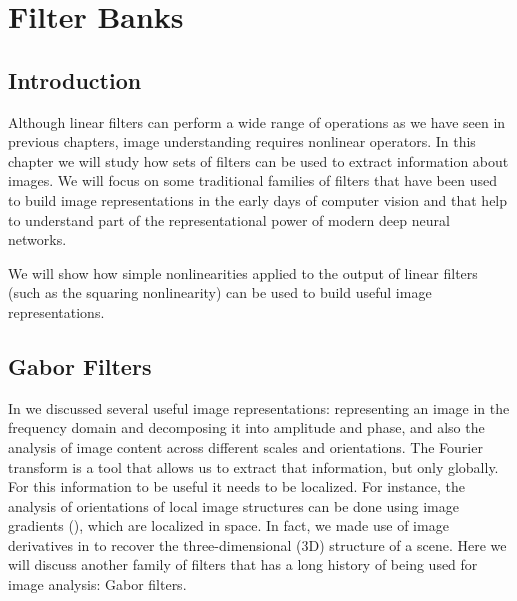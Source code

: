 
\chapter{Filter Banks}
\label{chapter:filter_banks}

\section{Introduction}

Although linear filters can perform a wide range of operations as we have seen in previous chapters, image understanding requires nonlinear operators. In this chapter we will study how sets of filters can be used to extract information about images. We will focus on some traditional families of filters that have been used to build image representations in the early days of computer vision and that help to understand part of the representational power of modern deep neural networks.

We will show how simple nonlinearities applied to the output of linear filters (such as the squaring nonlinearity) can be used to build useful image representations.


\section{Gabor Filters}

In \chap{\ref{chapter:fourier_analysis}} we discussed several useful image representations: representing an image in the frequency domain and decomposing it into amplitude and phase, and also the analysis of image content across different scales and orientations. The Fourier transform is a tool that allows us to extract that information, but only globally. For this information to be useful it needs to be localized. For instance, the analysis of orientations of local image structures can be done using image gradients (\chap{\ref{chapter:image_derivatives}}), which are localized in space. In fact, we made use of image derivatives in \chap{\ref{chapter:simplesystem}} to recover the three-dimensional (3D) structure of a scene. Here we will discuss another family of filters that has a long history of being used for image analysis: Gabor filters.

